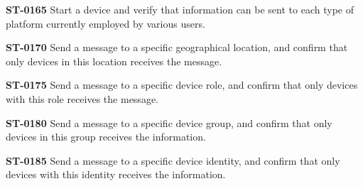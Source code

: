 \begin{description}
\item\textbf{ST-0165} Start a device and verify that information can be sent to each type of platform currently employed by various users. \\
\item\textbf{ST-0170} Send a message to a specific geographical location, and confirm that only devices in this location receives the message. \\
\item\textbf{ST-0175} Send a message to a specific device role, and confirm that only devices with this role receives the message. \\
\item\textbf{ST-0180} Send a message to a specific device group, and confirm that only devices in this group receives the information.\\
\item\textbf{ST-0185} Send a message to a specific device identity, and confirm that only devices with this identity receives the information. \\

\end{description}


